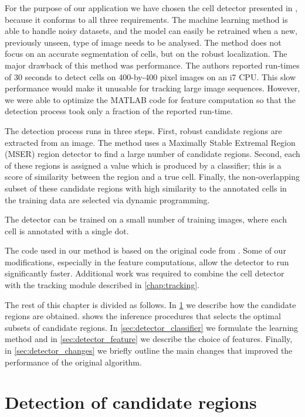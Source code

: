 	For the purpose of our application we have chosen the cell detector presented in \cite{arteta12}, because it conforms to all three requirements. The machine learning method is able to handle noisy datasets, and the model can easily be retrained when a new, previously unseen, type of image needs to be analysed. The method does not focus on an accurate segmentation of cells, but on the robust localization. The major drawback of this method was performance. The authors reported run-times of 30 seconds to detect cells on 400-by-400 pixel images on an i7 CPU. This slow performance would make it unusable for tracking large image sequences. However, we were able to optimize the MATLAB code for feature computation so that the detection process took only a fraction of the reported run-time.
	
	The detection process runs in three steps. First, robust candidate regions are extracted from an image. The method uses a Maximally Stable Extremal Region (MSER) region detector \cite{matas02} to find a large number of candidate regions. Second, each of these regions is assigned a value which is produced by a classifier; this is a score of similarity between the region and a true cell. Finally, the non-overlapping subset of these candidate regions with high similarity to the annotated cells in the training data are selected via dynamic programming.
	
	The detector can be trained on a small number of training images, where each cell is  annotated with a single dot. 

	The code used in our method is based on the original code from \cite{arteta12}. Some of our modifications, especially in the feature computations, allow the detector to run significantly faster. Additional work was required to combine the cell detector with the tracking module described in \cref{chap:tracking}.
	
	The rest of this chapter is divided as follows. In \cref{sec:detector_extremal} we describe how the candidate regions are obtained.  shows the inference procedures that selects the optimal subsets of candidate regions. In \cref{sec:detector_classifier} we formulate the learning method and in \cref{sec:detector_feature} we describe the choice of features. Finally, in \cref{sec:detector_changes} we briefly outline the main changes that improved the performance of the original algorithm.
	
	\section{Detection of candidate regions}
	\label{sec:detector_extremal}
	

